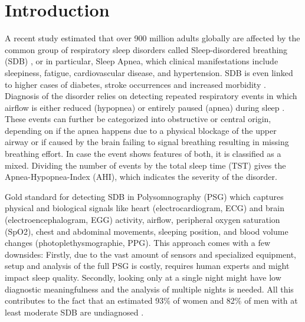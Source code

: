 \chapter{Introduction \label{Chapter-Intro}}

A recent study estimated that over 900 million adults globally are affected
 by the common group of respiratory sleep disorders called Sleep-disordered
 breathing (SDB) \cite{benjafield2019estimation}, or in particular, Sleep Apnea, which clinical
 manifestations include sleepiness, fatigue, cardiovascular disease, and
 hypertension. SDB is even linked to higher cases of diabetes, stroke
 occurrences and increased morbidity \cite{dempsey2010dempsey,patil2007adult,young2002epidemiology}.
Diagnosis of the disorder relies on detecting repeated respiratory events
 in which airflow is either reduced (hypopnea) or entirely paused (apnea)
 during sleep \cite{gould2012sleep,dempsey2010dempsey}. These events can further be categorized into
 obstructive or central origin, depending on if the apnea happens due to
 a physical blockage of the upper airway or if caused by the brain failing
 to signal breathing resulting in missing breathing effort. In case the
 event shows features of both, it is classified as a mixed.
Dividing the number of events by the total sleep time (TST) gives the
 Apnea-Hypopnea-Index (AHI), which indicates the severity of the disorder.

Gold standard for detecting SDB in Polysomnography (PSG) which captures
 physical and biological signals like heart (electrocardiogram, ECG) and
 brain (electroencephalogram, EGG) activity, airflow, peripheral oxygen
 saturation (SpO2), chest and abdominal movements, sleeping position, and
 blood volume changes (photoplethysmographie, PPG).
This approach comes with a few downsides: Firstly, due to the vast amount
 of sensors and specialized equipment, setup and analysis of the full PSG
 is costly, requires human experts and might impact sleep quality.
 Secondly, looking only at a single night might have low diagnostic
 meaningfulness \cite{toussaint1995first} and the analysis of multiple nights is needed. All
 this contributes to the fact that an estimated 93\% of women and 82\%
 of men with at least moderate SDB are undiagnosed \cite{young1997estimation}.

